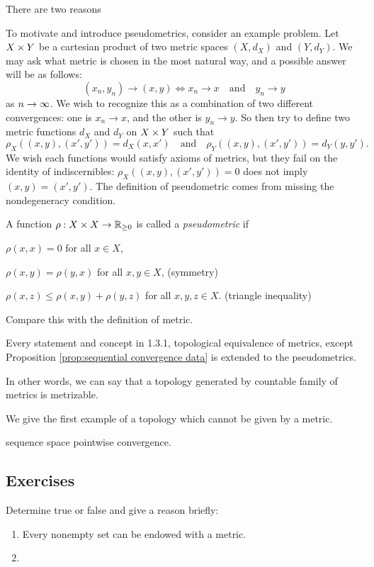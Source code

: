 \documentclass{../crs}
\begin{document}
There are two reasons 

To motivate and introduce pseudometrics, consider an example problem.
Let $X\times Y$ be a cartesian product of two metric spaces $(X,d_X)$ and $(Y,d_Y)$.
We may ask what metric is chosen in the most natural way, and a possible answer will be as follows:
\[(x_n,y_n)\to(x,y)\iff x_n\to x\quad\text{and}\quad y_n\to y\]
as $n\to\oo$.
We wish to recognize this as a combination of two different convergences: one is $x_n\to x$, and the other is $y_n\to y$.
So then try to define two metric functions $d_X$ and $d_Y$ on $X\times Y$ such that
\[\rho_X((x,y),(x',y'))=d_X(x,x')\quad\text{and}\quad\rho_Y((x,y),(x',y'))=d_Y(y,y').\]
We wish each functions would satisfy axioms of metrics, but they fail on the identity of indiscernibles: $\rho_X((x,y),(x',y'))=0$ does not imply $(x,y)=(x',y')$.
The definition of pseudometric comes from missing the nondegeneracy condition.

\begin{defn}
A function $\rho:X\x X\to\R_{\ge0}$ is called a \emph{pseudometric} if
\begin{cond}
\item $\rho(x,x)=0$ for all $x\in X$,
\item $\rho(x,y)=\rho(y,x)$ for all $x,y\in X$, \hfill(symmetry)
\item $\rho(x,z)\le \rho(x,y)+\rho(y,z)$ for all $x,y,z\in X$. \hfill(triangle inequality)
\end{cond}
\end{defn}
Compare this with the definition of metric.





Every statement and concept in 1.3.1, topological equivalence of metrics, except Proposition \ref{prop:sequential convergence data} is extended to the pseudometrics.

In other words, we can say that a topology generated by countable family of metrics is metrizable.

We give the first example of a topology which cannot be given by a metric.

\begin{ex}
sequence space pointwise convergence.
\end{ex}



\subsection*{Exercises}
Determine true or false and give a reason briefly:
\begin{enumerate}
\item Every nonempty set can be endowed with a metric.
\item 
\end{enumerate}
\end{document}
